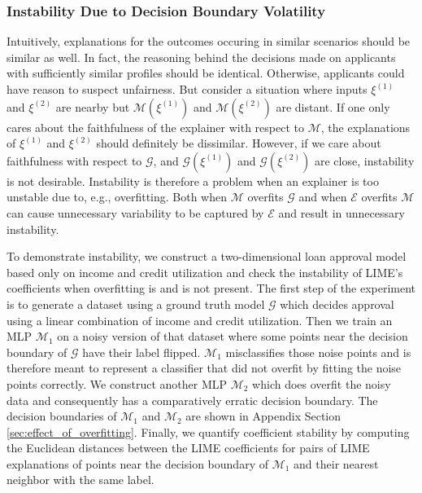 \documentclass[mnsc,blindrev]{informs3}
\begin{document}
        \subsubsection{Instability Due to Decision Boundary Volatility}         
            \label{sec:instability}
            Intuitively, explanations for the outcomes occuring in similar scenarios should be similar as well. In fact, the reasoning behind the decisions made on applicants with sufficiently similar profiles should be identical. Otherwise, applicants could have reason to suspect unfairness. But consider a situation where inputs $\xi^{(1)}$ and $\xi^{(2)}$ are nearby but $\mathcal{M}(\xi^{(1)})$ and $\mathcal{M}(\xi^{(2)})$ are distant. If one only cares about the faithfulness of the explainer with respect to $\mathcal{M}$, the explanations of $\xi^{(1)}$ and $\xi^{(2)}$ should definitely be dissimilar. However, if we care about faithfulness with respect to $\mathcal{G}$, and $\mathcal{G}(\xi^{(1)})$ and $\mathcal{G}(\xi^{(2)})$ are close, instability is not desirable. Instability is therefore a problem when an explainer is too unstable due to, e.g., overfitting. Both when $\mathcal{M}$ overfits $\mathcal{G}$ and when $\mathcal{E}$ overfits $\mathcal{M}$ can cause unnecessary variability to be captured by $\mathcal{E}$ and result in unnecessary instability. 
          
            To demonstrate instability, we construct a two-dimensional loan approval model based only on income and credit utilization and check the instability of LIME's coefficients when overfitting is and is not present. %
            The first step of the experiment is to generate a dataset using a ground truth model $\mathcal{G}$ which decides approval using a linear combination of income and credit utilization. Then we train an MLP $\mathcal{M}_1$ on a noisy version of that dataset where some points near the decision boundary of $\mathcal{G}$ have their label flipped. $\mathcal{M}_1$ misclassifies those noise points and is therefore meant to represent a classifier that did not overfit by fitting the noise points correctly. We construct another MLP $\mathcal{M}_{2}$ which does overfit the noisy data and consequently has a comparatively erratic decision boundary. The decision boundaries of $\mathcal{M}_1$ and $\mathcal{M}_2$ are shown in Appendix Section \ref{sec:effect_of_overfitting}. Finally, we quantify coefficient stability by computing the Euclidean distances between the LIME coefficients for pairs of LIME explanations of points near the decision boundary of $\mathcal{M}_1$ and their nearest neighbor with the same label. 
\end{document}
